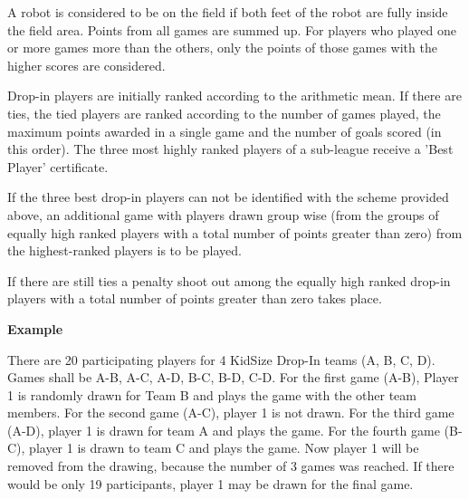  A robot is considered to be on the field if both feet of the robot are fully inside the field area.  Points from all games are summed up. For players who played one or more games more than the others, only the points of those games with the higher scores are considered.

Drop-in players are initially ranked according to the arithmetic mean.
If there are ties, the tied players are ranked according to the number of games played,
the maximum points awarded in a single game and the number of goals scored (in
this order).
The three most highly ranked players of a sub-league receive a 'Best Player' certificate.

If the three best drop-in players can not be identified with the scheme provided above, an additional game with players drawn group wise (from the groups of equally high ranked players with a total number of points greater than zero) from the highest-ranked players is to be played.

If there are still ties a penalty shoot out among the equally high ranked drop-in players with a total number of points greater than zero takes place.

\bigskip 
 
{\bfseries Example}
 
There are 20 participating players for 4 KidSize Drop-In teams (A, B, C, D). Games shall be A-B, A-C, A-D, B-C, B-D, C-D. For the first game (A-B), Player 1 is randomly drawn for Team B and plays the game with the other team members. For the second game (A-C), player 1 is not drawn. For the third game (A-D), player 1 is drawn for team A and plays the game. For the fourth game (B-C), player 1 is drawn to team C and plays the game. Now player 1 will be removed from the drawing, because the number of 3 games was reached. If there would be only 19 participants, player 1 may be drawn for the final game.

